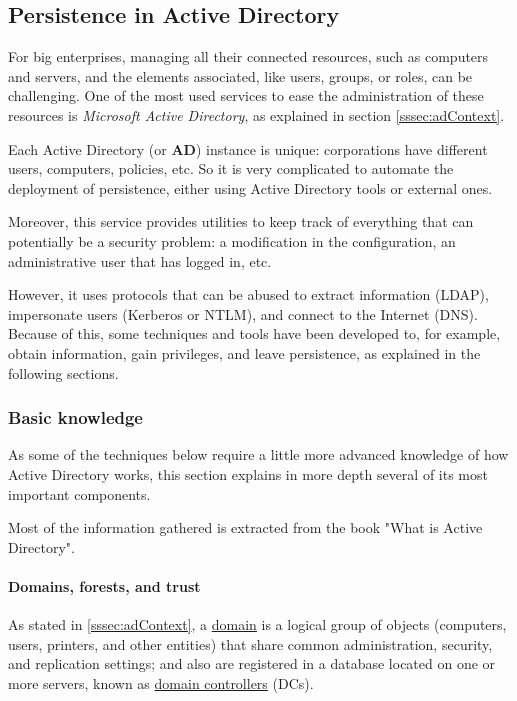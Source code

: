 \pagebreak
\subsection{Persistence in Active Directory}
\label{ssec:ad}
For big enterprises, managing all their connected resources, such as computers and servers, and the elements associated, like users, groups, or roles, can be challenging. One of the most used services to ease the administration of these resources is \textit{Microsoft Active Directory}, as explained in section \ref{sssec:adContext}.

Each Active Directory (or \textbf{AD}) instance is unique: corporations have different users, computers, policies, etc. So it is very complicated to automate the deployment of persistence, either using Active Directory tools or external ones. 

Moreover, this service provides utilities to keep track of everything that can potentially be a security problem: a modification in the configuration, an administrative user that has logged in, etc.
 
However, it uses protocols that can be abused to extract information (LDAP), impersonate users (Kerberos or NTLM), and connect to the Internet (DNS). Because of this, some techniques and tools have been developed to, for example, obtain information, gain privileges, and leave persistence, as explained in the following sections.

\subsubsection{Basic knowledge}
\label{sssec:adBasics}
As some of the techniques below require a little more advanced knowledge of how Active Directory works, this section explains in more depth several of its most important components.

Most of the information gathered is extracted from the book "What is Active Directory"\cite{newtrixBook}.

\paragraph{Domains, forests, and trust}
As stated in \ref{sssec:adContext}, a \underline{domain} is a logical group of objects (computers, users, printers, and other entities) that share common administration, security, and replication settings; and also are registered in a database located on one or more servers, known as \underline{domain controllers} (DCs). 

